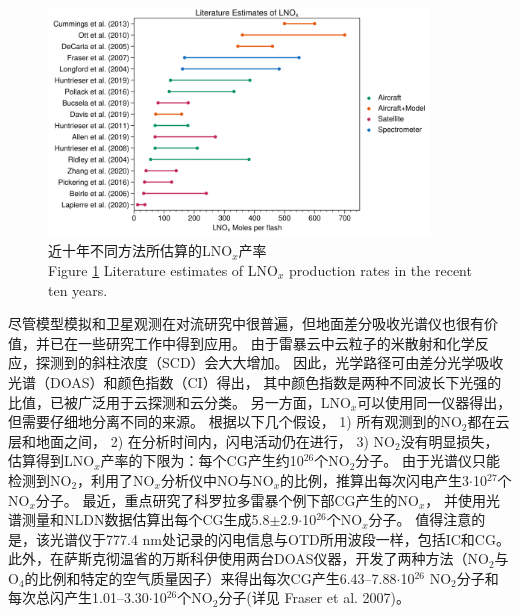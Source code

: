\begin{figure}[htbp]
\centering
\includegraphics[width=0.9\textwidth]{./figures/lnox_production_xin.png}
\caption{近十年不同方法所估算的LNO$_x$产率\\
Figure \ref{figure:lnox_production_xin} Literature estimates of LNO$_x$ production rates in the recent ten years.}
\label{figure:lnox_production_xin}
\end{figure}

尽管模型模拟和卫星观测在对流研究中很普遍，但地面差分吸收光谱仪也很有价值，并已在一些研究工作中得到应用。
由于雷暴云中云粒子的米散射和化学反应，探测到的斜柱浓度（SCD）会大大增加\citep{Erle.1995,Pfeilsticker.1998,Winterrath.1999}。
因此，光学路径可由差分光学吸收光谱（DOAS）\citep{Veitel.1998,Wagner.1998}和颜色指数（CI）得出，
其中颜色指数是两种不同波长下光强的比值，已被广泛用于云探测和云分类\citep{Wagner.2014,Wang.2015,Wagner.2016}。
另一方面，LNO$_x$可以使用同一仪器得出，但需要仔细地分离不同的来源。
\citet{Noxon.1976}根据以下几个假设，
1) 所有观测到的NO$_2$都在云层和地面之间，
2) 在分析时间内，闪电活动仍在进行，
3) NO$_2$没有明显损失，估算得到LNO$_x$产率的下限为：每个CG产生约10$^{26}$个NO$_2$分子。
由于光谱仪只能检测到NO$_2$，\citet{Franzblau.1989}利用了NO$_x$分析仪中NO与NO$_x$的比例，推算出每次闪电产生3$\cdot$10$^{27}$个NO$_x$分子。
最近，\citet{Langford.2004}重点研究了科罗拉多雷暴个例下部CG产生的NO$_x$，
并使用光谱测量和NLDN数据估算出每个CG生成5.8$\pm$2.9$\cdot$10$^{26}$个NO$_x$分子。
值得注意的是，该光谱仪于777.4 nm处记录的闪电信息与OTD所用波段一样，包括IC和CG。
此外，在萨斯克彻温省的万斯科伊使用两台DOAS仪器，开发了两种方法（NO$_2$与O$_4$的比例和特定的空气质量因子）来得出每次CG产生6.43--7.88$\cdot$10$^{26}$ NO$_2$分子和每次总闪产生1.01--3.30$\cdot$10$^{26}$个NO$_2$分子(详见 Fraser et al. 2007)。

